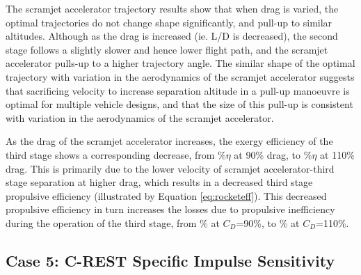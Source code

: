 The scramjet accelerator trajectory results show that when drag is varied, the optimal trajectories do not change shape significantly, and pull-up to similar altitudes. Although as the drag is increased (ie. L/D is decreased), the second stage follows a slightly slower and hence lower flight path, and the scramjet accelerator pulls-up to a higher trajectory angle. The similar shape of the optimal trajectory with variation in the aerodynamics of the scramjet accelerator suggests that sacrificing velocity to increase separation altitude in a pull-up manoeuvre is optimal for multiple vehicle designs, and that the size of this pull-up is consistent with variation in the aerodynamics of the scramjet accelerator. 

As the drag of the scramjet accelerator increases, the exergy efficiency of the third stage shows a corresponding decrease, from \thirddExergyEffCdNinetyNoReturn\%$\eta$ at 90\% drag, to \thirddExergyEffCdOneHundredTenNoReturn\%$\eta$ at 110\% drag.
This is primarily due to the lower velocity of scramjet accelerator-third stage separation at higher drag, which results in a decreased third stage propulsive efficiency (illustrated by Equation \ref{eq:rocketeff}). This decreased propulsive efficiency in turn increases the losses due to propulsive inefficiency during the operation of the third stage, from \PlossthreeCdNinetyNoReturn\% at $C_D$=90\%, to \PlossthreeCdOneHundredTenNoReturn\% at $C_D$=110\%.


\subsection{Case 5: C-REST Specific Impulse Sensitivity}\label{sec:ispsensitivitynoflyback}

